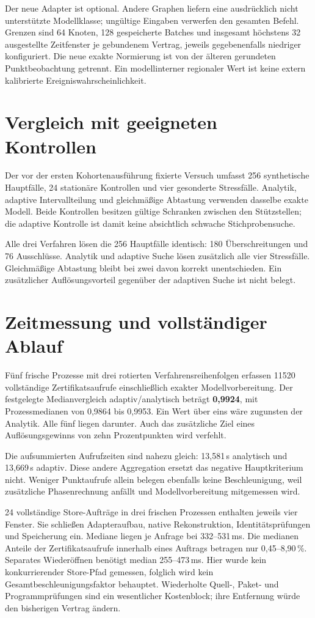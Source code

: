 \documentclass[11pt,a4paper]{article}
\begin{document}
Der neue Adapter ist optional. Andere Graphen liefern eine ausdrücklich nicht unterstützte Modellklasse; ungültige Eingaben verwerfen den gesamten Befehl. Grenzen sind 64 Knoten, 128 gespeicherte Batches und insgesamt höchstens 32 ausgestellte Zeitfenster je gebundenem Vertrag, jeweils gegebenenfalls niedriger konfiguriert. Die neue exakte Normierung ist von der älteren gerundeten Punktbeobachtung getrennt. Ein modellinterner regionaler Wert ist keine extern kalibrierte Ereigniswahrscheinlichkeit.

\section*{Vergleich mit geeigneten Kontrollen}
Der vor der ersten Kohortenausführung fixierte Versuch umfasst 256 synthetische Hauptfälle, 24 stationäre Kontrollen und vier gesonderte Stressfälle. Analytik, adaptive Intervallteilung und gleichmäßige Abtastung verwenden dasselbe exakte Modell. Beide Kontrollen besitzen gültige Schranken zwischen den Stützstellen; die adaptive Kontrolle ist damit keine absichtlich schwache Stichprobensuche.

Alle drei Verfahren lösen die 256 Hauptfälle identisch: 180 Überschreitungen und 76 Ausschlüsse. Analytik und adaptive Suche lösen zusätzlich alle vier Stressfälle. Gleichmäßige Abtastung bleibt bei zwei davon korrekt unentschieden. Ein zusätzlicher Auflösungsvorteil gegenüber der adaptiven Suche ist nicht belegt.

\newpage
\section*{Zeitmessung und vollständiger Ablauf}
Fünf frische Prozesse mit drei rotierten Verfahrensreihenfolgen erfassen 11520 vollständige Zertifikatsaufrufe einschließlich exakter Modellvorbereitung. Der festgelegte Medianvergleich adaptiv/analytisch beträgt \textbf{0,9924}, mit Prozessmedianen von 0,9864 bis 0,9953. Ein Wert über eins wäre zugunsten der Analytik. Alle fünf liegen darunter. Auch das zusätzliche Ziel eines Auflösungsgewinns von zehn Prozentpunkten wird verfehlt.

Die aufsummierten Aufrufzeiten sind nahezu gleich: 13,581\,s analytisch und 13,669\,s adaptiv. Diese andere Aggregation ersetzt das negative Hauptkriterium nicht. Weniger Punktaufrufe allein belegen ebenfalls keine Beschleunigung, weil zusätzliche Phasenrechnung anfällt und Modellvorbereitung mitgemessen wird.

24 vollständige Store-Aufträge in drei frischen Prozessen enthalten jeweils vier Fenster. Sie schließen Adapteraufbau, native Rekonstruktion, Identitätsprüfungen und Speicherung ein. Mediane liegen je Anfrage bei 332--531\,ms. Die medianen Anteile der Zertifikatsaufrufe innerhalb eines Auftrags betragen nur 0,45--8,90\,\%. Separates Wiederöffnen benötigt median 255--473\,ms. Hier wurde kein konkurrierender Store-Pfad gemessen, folglich wird kein Gesamtbeschleunigungsfaktor behauptet. Wiederholte Quell-, Paket- und Programmprüfungen sind ein wesentlicher Kostenblock; ihre Entfernung würde den bisherigen Vertrag ändern.
\end{document}
